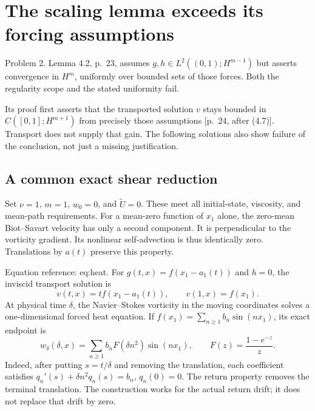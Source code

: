 \documentclass[10pt]{article}
\begin{document}
\section*{The scaling lemma exceeds its forcing assumptions}
Problem 2.  Lemma 4.2, p. 23, assumes \(g,h\in L^2((0,1);H^{m-1})\) but asserts convergence in \(H^m\), uniformly over bounded sets of those forces. Both the regularity scope and the stated uniformity fail.\par
Its proof first asserts that the transported solution \(v\) stays bounded in \(C([0,1];H^{m+1})\) from precisely those assumptions [p. 24, after (4.7)]. Transport does not supply that gain. The following solutions also show failure of the conclusion, not just a missing justification.\par
\subsection*{A common exact shear reduction}
Set \(\nu=1\), \(m=1\), \(w_0=0\), and \(\widetilde U=0\). These meet all initial-state, viscosity, and mean-path requirements. For a mean-zero function of \(x_1\) alone, the zero-mean Biot–Savart velocity has only a second component. It is perpendicular to the vorticity gradient. Its nonlinear self-advection is thus identically zero. Translations by \(a(t)\) preserve this property.\par
Equation reference: eq:heat. For \(g(t,x)=f(x_1-a_1(t))\) and \(h=0\), the inviscid transport solution is \[v(t,x)=t f(x_1-a_1(t)),\qquad v(1,x)=f(x_1).\] At physical time \(\delta\), the Navier–Stokes vorticity in the moving coordinates solves a one-dimensional forced heat equation. If \(f(x_1)=\sum_{n\ge1}b_n\sin(nx_1)\), its exact endpoint is \[w_\delta(\delta,x)=\sum_{n\ge1}b_n F(\delta n^2)\sin(nx_1),
 \qquad F(z)=\frac{1-e^{-z}}{z}.                             \] Indeed, after putting \(s=t/\delta\) and removing the translation, each coefficient satisfies \(q_n'(s)+\delta n^2q_n(s)=b_n\), \(q_n(0)=0\). The return property removes the terminal translation. The construction works for the actual return drift; it does not replace that drift by zero.\par
\end{document}

